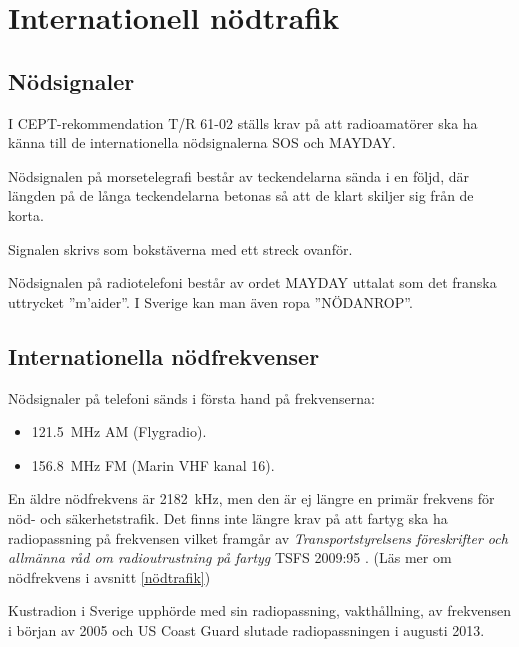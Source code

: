 \section{Internationell nödtrafik}

\subsection{Nödsignaler}

I CEPT-rekommendation T/R 61-02 \cite{TR6102} ställs krav på att radioamatörer
ska ha känna till de internationella nödsignalerna SOS och MAYDAY.

Nödsignalen på morsetelegrafi består av teckendelarna \Mcharsep\MSOS %
sända i en följd, där längden på de långa teckendelarna betonas så att de klart
skiljer sig från de korta.

Signalen skrivs som bokstäverna  med ett streck ovanför.

Nödsignalen på radiotelefoni består av ordet MAYDAY uttalat som det franska
uttrycket ''m'aider''. I Sverige kan man även ropa ''NÖDANROP''.

\subsection{Internationella nödfrekvenser}

Nödsignaler på telefoni sänds i första hand på frekvenserna:

\begin{itemize}
  \item \SI{121,5}{\mega\hertz} AM (Flygradio).
  \item \SI{156,8}{\mega\hertz} FM (Marin VHF kanal 16).
\end{itemize}

En äldre nödfrekvens är \SI{2182}{\kilo\hertz}, men den är ej längre en primär
frekvens för nöd- och säkerhetstrafik.
Det finns inte längre krav på att fartyg ska ha radiopassning på frekvensen
vilket framgår av \emph{Transportstyrelsens föreskrifter och allmänna råd
	om radioutrustning på fartyg} TSFS 2009:95 \cite[\S22]{TSFS2009:95}.
(Läs mer om nödfrekvens i avsnitt \ref{nödtrafik})

Kustradion i Sverige upphörde med sin radiopassning, vakthållning, av frekvensen
i början av 2005 och US Coast Guard slutade radiopassningen i augusti 2013.

